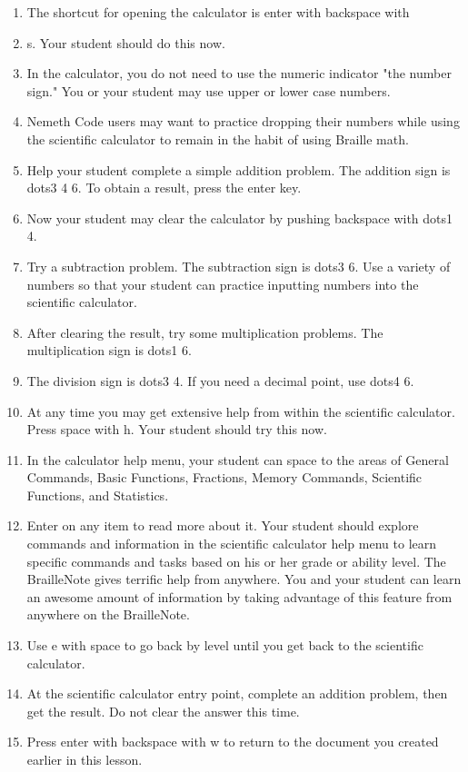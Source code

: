 \documentclass[10pt,letterpaper,twoside]{report}
\begin{document}
{{{\begin{enumerate}
	\item The shortcut for opening the calculator is enter with backspace with
	\item s. Your student should do this now.
	\item In the calculator, you do not need to use the numeric indicator "the number sign." You or your student may use upper or lower case numbers.
	\item Nemeth Code users may want to practice dropping their numbers while using the scientific calculator to remain in the habit of using Braille math.
	\item Help your student complete a simple addition problem.  The addition sign is dots3 4 6.  To obtain a result, press the enter key.
	\item Now your student may clear the calculator by pushing backspace with dots1 4.
	\item Try a subtraction problem.  The subtraction sign is dots3 6.  Use a variety of numbers so that your student can practice inputting numbers into the scientific calculator.
	\item After clearing the result, try some multiplication problems.  The multiplication sign is dots1 6.
	\item The division sign is dots3 4.  If you need a decimal point, use dots4 6.
	\item At any time you may get extensive help from within the scientific calculator.  Press space with h.  Your student should try this now.
	\item In the calculator help menu, your student can space to the areas of General Commands, Basic Functions, Fractions, Memory Commands, Scientific Functions, and Statistics.
	\item Enter on any item to read more about it.  Your student should explore commands and information in the scientific calculator help menu to learn specific commands and tasks based on his or her grade or ability level. The BrailleNote gives terrific help from anywhere.  You and your student can learn an awesome amount of information by taking advantage of this feature from anywhere on the BrailleNote.
	\item Use e with space to go back by level until you get back to the scientific calculator.
	\item At the scientific calculator entry point, complete an addition problem, then get the result.  Do not clear the answer this time.
	\item Press enter with backspace with w to return to the document you created earlier in this lesson.

\end{enumerate}}}}
\end{document}
